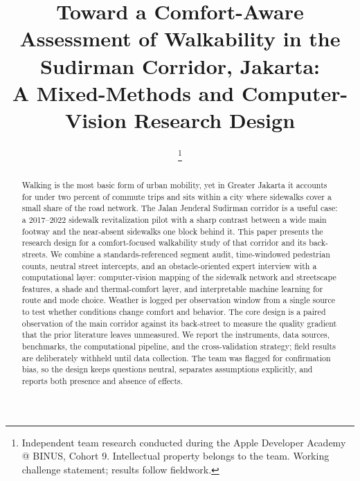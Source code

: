 \documentclass[conference]{IEEEtran}
\begin{document}
\title{Toward a Comfort-Aware Assessment of Walkability in the Sudirman Corridor, Jakarta:\\
A Mixed-Methods and Computer-Vision Research Design}

\author{%
  \thanks{Independent team research conducted during the Apple Developer Academy @ BINUS,
  Cohort 9. Intellectual property belongs to the team. Working challenge statement; results
  follow fieldwork.}%
}

\maketitle

\begin{abstract}
Walking is the most basic form of urban mobility, yet in Greater Jakarta it accounts for under
two percent of commute trips and sits within a city where sidewalks cover a small share of the
road network. The Jalan Jenderal Sudirman corridor is a useful case: a 2017--2022 sidewalk
revitalization pilot with a sharp contrast between a wide main footway and the near-absent
sidewalks one block behind it. This paper presents the research design for a comfort-focused
walkability study of that corridor and its back-streets. We combine a standards-referenced
segment audit, time-windowed pedestrian counts, neutral street intercepts, and an
obstacle-oriented expert interview with a computational layer: computer-vision mapping of the
sidewalk network and streetscape features, a shade and thermal-comfort layer, and interpretable
machine learning for route and mode choice. Weather is logged per observation window from a
single source to test whether conditions change comfort and behavior. The core design is a
paired observation of the main corridor against its back-street to measure the quality gradient
that the prior literature leaves unmeasured. We report the instruments, data sources, benchmarks,
the computational pipeline, and the cross-validation strategy; field results are deliberately
withheld until data collection. The team was flagged for confirmation bias, so the design keeps
questions neutral, separates assumptions explicitly, and reports both presence and absence of
effects.
\end{abstract}
\end{document}
